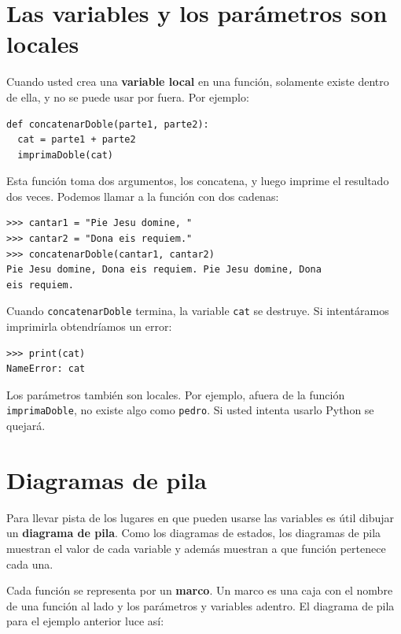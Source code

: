 \section{Las variables y los parámetros son locales}

 

Cuando usted crea una \textbf{variable local} en una función, solamente
existe dentro de ella, y no se puede usar por fuera. Por ejemplo:

\begin{verbatim}
def concatenarDoble(parte1, parte2):
  cat = parte1 + parte2
  imprimaDoble(cat)
\end{verbatim}
 Esta función toma dos argumentos, los concatena, y luego imprime
el resultado dos veces. Podemos llamar a la función con dos cadenas:

\begin{verbatim}
>>> cantar1 = "Pie Jesu domine, "
>>> cantar2 = "Dona eis requiem."
>>> concatenarDoble(cantar1, cantar2)
Pie Jesu domine, Dona eis requiem. Pie Jesu domine, Dona 
eis requiem.
\end{verbatim}

Cuando \texttt{concatenarDoble} termina, la variable \texttt{cat}
se destruye. Si intentáramos imprimirla obtendríamos un error:

\begin{verbatim}
>>> print(cat)
NameError: cat
\end{verbatim}
 Los parámetros también son locales. Por ejemplo, afuera de la función
\texttt{imprimaDoble}, no existe algo como \texttt{pedro}. Si usted
intenta usarlo Python se quejará.

\section{Diagramas de pila}

\label{stackdiagram}  

Para llevar pista de los lugares en que pueden usarse las variables
es útil dibujar un \textbf{diagrama de pila}. Como los diagramas de
estados, los diagramas de pila muestran el valor de cada variable
y además muestran a que función pertenece cada una.

Cada función se representa por un \textbf{marco}. Un marco es una
caja con el nombre de una función al lado y los parámetros y variables
adentro. El diagrama de pila para el ejemplo anterior luce así:

